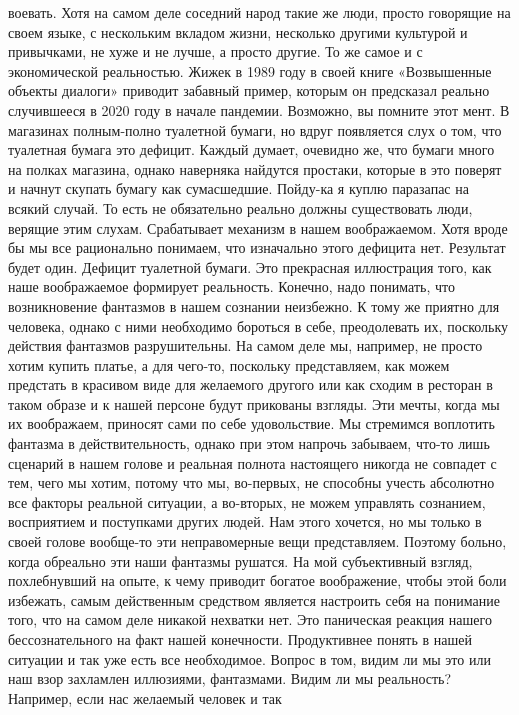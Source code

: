 воевать. Хотя на самом деле соседний народ такие же люди, просто говорящие на
своем языке, с нескольким вкладом жизни, несколько другими культурой и
привычками, не хуже и не лучше, а просто другие. То же самое и с экономической
реальностью. Жижек в 1989 году в своей книге «Возвышенные объекты диалоги»
приводит забавный пример, которым он предсказал реально случившееся в 2020 году
в начале пандемии. Возможно, вы помните этот мент. В магазинах полным-полно
туалетной бумаги, но вдруг появляется слух о том, что туалетная бумага это
дефицит. Каждый думает, очевидно же, что бумаги много на полках магазина, однако
наверняка найдутся простаки, которые в это поверят и начнут скупать бумагу как
сумасшедшие. Пойду-ка я куплю паразапас на всякий случай. То есть не обязательно
реально должны существовать люди, верящие этим слухам. Срабатывает механизм в
нашем воображаемом. Хотя вроде бы мы все рационально понимаем, что изначально
этого дефицита нет. Результат будет один. Дефицит туалетной бумаги. Это
прекрасная иллюстрация того, как наше воображаемое формирует реальность.
Конечно, надо понимать, что возникновение фантазмов в нашем сознании неизбежно.
К тому же приятно для человека, однако с ними необходимо бороться в себе,
преодолевать их, поскольку действия фантазмов разрушительны. На самом деле мы,
например, не просто хотим купить платье, а для чего-то, поскольку представляем,
как можем предстать в красивом виде для желаемого другого или как сходим в
ресторан в таком образе и к нашей персоне будут прикованы взгляды. Эти мечты,
когда мы их воображаем, приносят сами по себе удовольствие. Мы стремимся
воплотить фантазма в действительность, однако при этом напрочь забываем, что-то
лишь сценарий в нашем голове и реальная полнота настоящего никогда не совпадет с
тем, чего мы хотим, потому что мы, во-первых, не способны учесть абсолютно все
факторы реальной ситуации, а во-вторых, не можем управлять сознанием,
восприятием и поступками других людей. Нам этого хочется, но мы только в своей
голове вообще-то эти неправомерные вещи представляем. Поэтому больно, когда
обреально эти наши фантазмы рушатся. На мой субъективный взгляд, похлебнувший на
опыте, к чему приводит богатое воображение, чтобы этой боли избежать, самым
действенным средством является настроить себя на понимание того, что на самом
деле никакой нехватки нет. Это паническая реакция нашего бессознательного на
факт нашей конечности. Продуктивнее понять в нашей ситуации и так уже есть все
необходимое. Вопрос в том, видим ли мы это или наш взор захламлен иллюзиями,
фантазмами. Видим ли мы реальность? Например, если нас желаемый человек и так

